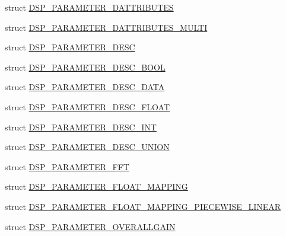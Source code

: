 \begin{DoxyCompactItemize}
\item 
struct \hyperlink{struct_f_m_o_d_1_1_d_s_p___p_a_r_a_m_e_t_e_r__3_d_a_t_t_r_i_b_u_t_e_s}{D\+S\+P\+\_\+\+P\+A\+R\+A\+M\+E\+T\+E\+R\+\_\+D\+A\+T\+T\+R\+I\+B\+U\+T\+ES}
\item 
struct \hyperlink{struct_f_m_o_d_1_1_d_s_p___p_a_r_a_m_e_t_e_r__3_d_a_t_t_r_i_b_u_t_e_s___m_u_l_t_i}{D\+S\+P\+\_\+\+P\+A\+R\+A\+M\+E\+T\+E\+R\+\_\+D\+A\+T\+T\+R\+I\+B\+U\+T\+E\+S\+\_\+\+M\+U\+L\+TI}
\item 
struct \hyperlink{struct_f_m_o_d_1_1_d_s_p___p_a_r_a_m_e_t_e_r___d_e_s_c}{D\+S\+P\+\_\+\+P\+A\+R\+A\+M\+E\+T\+E\+R\+\_\+\+D\+E\+SC}
\item 
struct \hyperlink{struct_f_m_o_d_1_1_d_s_p___p_a_r_a_m_e_t_e_r___d_e_s_c___b_o_o_l}{D\+S\+P\+\_\+\+P\+A\+R\+A\+M\+E\+T\+E\+R\+\_\+\+D\+E\+S\+C\+\_\+\+B\+O\+OL}
\item 
struct \hyperlink{struct_f_m_o_d_1_1_d_s_p___p_a_r_a_m_e_t_e_r___d_e_s_c___d_a_t_a}{D\+S\+P\+\_\+\+P\+A\+R\+A\+M\+E\+T\+E\+R\+\_\+\+D\+E\+S\+C\+\_\+\+D\+A\+TA}
\item 
struct \hyperlink{struct_f_m_o_d_1_1_d_s_p___p_a_r_a_m_e_t_e_r___d_e_s_c___f_l_o_a_t}{D\+S\+P\+\_\+\+P\+A\+R\+A\+M\+E\+T\+E\+R\+\_\+\+D\+E\+S\+C\+\_\+\+F\+L\+O\+AT}
\item 
struct \hyperlink{struct_f_m_o_d_1_1_d_s_p___p_a_r_a_m_e_t_e_r___d_e_s_c___i_n_t}{D\+S\+P\+\_\+\+P\+A\+R\+A\+M\+E\+T\+E\+R\+\_\+\+D\+E\+S\+C\+\_\+\+I\+NT}
\item 
struct \hyperlink{struct_f_m_o_d_1_1_d_s_p___p_a_r_a_m_e_t_e_r___d_e_s_c___u_n_i_o_n}{D\+S\+P\+\_\+\+P\+A\+R\+A\+M\+E\+T\+E\+R\+\_\+\+D\+E\+S\+C\+\_\+\+U\+N\+I\+ON}
\item 
struct \hyperlink{struct_f_m_o_d_1_1_d_s_p___p_a_r_a_m_e_t_e_r___f_f_t}{D\+S\+P\+\_\+\+P\+A\+R\+A\+M\+E\+T\+E\+R\+\_\+\+F\+FT}
\item 
struct \hyperlink{struct_f_m_o_d_1_1_d_s_p___p_a_r_a_m_e_t_e_r___f_l_o_a_t___m_a_p_p_i_n_g}{D\+S\+P\+\_\+\+P\+A\+R\+A\+M\+E\+T\+E\+R\+\_\+\+F\+L\+O\+A\+T\+\_\+\+M\+A\+P\+P\+I\+NG}
\item 
struct \hyperlink{struct_f_m_o_d_1_1_d_s_p___p_a_r_a_m_e_t_e_r___f_l_o_a_t___m_a_p_p_i_n_g___p_i_e_c_e_w_i_s_e___l_i_n_e_a_r}{D\+S\+P\+\_\+\+P\+A\+R\+A\+M\+E\+T\+E\+R\+\_\+\+F\+L\+O\+A\+T\+\_\+\+M\+A\+P\+P\+I\+N\+G\+\_\+\+P\+I\+E\+C\+E\+W\+I\+S\+E\+\_\+\+L\+I\+N\+E\+AR}
\item 
struct \hyperlink{struct_f_m_o_d_1_1_d_s_p___p_a_r_a_m_e_t_e_r___o_v_e_r_a_l_l_g_a_i_n}{D\+S\+P\+\_\+\+P\+A\+R\+A\+M\+E\+T\+E\+R\+\_\+\+O\+V\+E\+R\+A\+L\+L\+G\+A\+IN}

\end{DoxyCompactItemize}
